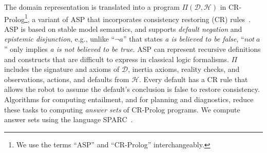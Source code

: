 \documentclass[letterpaper, 10 pt, conference]{article}  %
\begin{document}
The domain representation is translated into a program
$\Pi(\mathcal{D}, \mathcal{H})$ in CR-Prolog\footnote{We use the terms
  ``ASP'' and ``CR-Prolog'' interchangeably.}, a variant of ASP that
incorporates consistency restoring (CR)
rules~\cite{balduccini:aaaisymp03}. ASP is based on stable model
semantics, and supports \emph{default negation} and \emph{epistemic
  disjunction}, e.g., unlike ``$\lnot a$'' that states \emph{a is
  believed to be false}, ``$not~a$'' only implies \emph{a is not
  believed to be true}.  ASP can represent recursive definitions and
constructs that are difficult to express in classical logic
formalisms. $\Pi$ includes the signature and axioms of $\mathcal{D}$,
inertia axioms, reality checks, and observations, actions, and
defaults from $\mathcal{H}$. Every default has a CR rule that allows
the robot to assume the default's conclusion is false to restore
consistency.  Algorithms for computing entailment, and for planning
and diagnostics, reduce these tasks to computing \emph{answer sets} of
CR-Prolog programs. We compute answer sets using the language
SPARC~\cite{balai:lpnmr13}.

\end{document}
